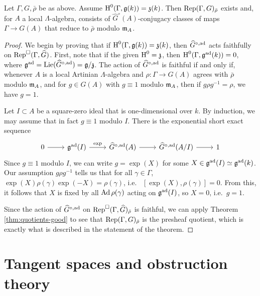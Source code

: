 \begin{theorem}
Let $\Gamma,G,\bar\rho$ be as above. Assume $\operatorname{H}^0(\Gamma,\mathfrak{g}(k))=\mathfrak{z}(k)$. Then 
$\operatorname{Rep}(\Gamma,G)_{\bar\rho}$ exists and, for $A$ a local $\Lambda$-algebra, 
consists of $\widehat G^\circ(A)$-conjugacy classes of maps 
$\Gamma \to  G(A)$ that reduce to $\bar\rho$ modulo $\mathfrak{m}_A$. 
\end{theorem}
\begin{proof}
We begin by proving that if $\operatorname{H}^0(\Gamma,\mathfrak{g}(k)) = \mathfrak{z}(k)$, then 
$\widehat G^{\circ,\mathrm{ad}}$ acts faithfully on $\operatorname{Rep}^\square(\Gamma,\widehat G)$. 
First, note that if the given $\operatorname{H}^0 = \mathfrak{z}$, then 
$\operatorname{H}^0(\Gamma,\mathfrak{g}^{\mathrm{ad}}(k)) = 0$, where 
$\mathfrak{g}^{\mathrm{ad}} = \operatorname{Lie}(\widehat G^{\circ,\mathrm{ad}}) = \mathfrak{g} / \mathfrak{z}$. The action of 
$\widehat G^{\circ,\mathrm{ad}}$ is faithful if and only if, whenever $A$ is a local 
Artinian $\Lambda$-algebra and $\rho\colon \Gamma \to G(A)$ agrees with 
$\bar\rho$ modulo $\mathfrak{m}_A$, and for $g\in G(A)$ with $g\equiv 1$ modulo 
$\mathfrak{m}_A$, then if $g \rho g^{-1} = \rho$, we have $g = 1$. 

Let $I\subset A$ be a square-zero ideal that is one-dimensional over $k$. By 
induction, we may assume that in fact $g \equiv 1$ modulo $I$. There is the 
exponential short exact sequence 
\[
\begin{tikzcd}
	0 \ar[r]
		& \fg^\ad(I) \ar[r, "\exp"] 
		& \widehat G^{\circ,\ad}(A) \ar[r]
		& \widehat G^{\circ,\ad}(A/I) \ar[r]
		& 1
\end{tikzcd}
\]
Since $g\equiv 1$ modulo $I$, we can write $g = \exp(X)$ for some 
$X\in \mathfrak{g}^{\mathrm{ad}}(I)\simeq \mathfrak{g}^{\mathrm{ad}}(k)$. Our assumption $g \rho g^{-1}$ tells 
us that for all $\gamma\in \Gamma$, 
$\exp(X)\rho(\gamma) \exp(-X) = \rho(\gamma)$, i.e.~
$[\exp(X),\rho(\gamma)] = 0$. From this, it follows that $X$ is fixed by all 
$\operatorname{Ad}\rho(\gamma)$ acting on $\mathfrak{g}^{\mathrm{ad}}(I)$, so $X = 0$, i.e.~$g = 1$. 

Since the action of $\widehat G^{\circ,\mathrm{ad}}$ on 
$\operatorname{Rep}^\square(\Gamma,\widehat G)_{\bar\rho}$ is faithful, we can apply 
Theorem \ref{thm:quotients-good} to see that $\operatorname{Rep}(\Gamma,G)_{\bar\rho}$ is 
the presheaf quotient, which is exactly what is described in the statement of 
the theorem. 
\end{proof}





\section{Tangent spaces and obstruction theory}

